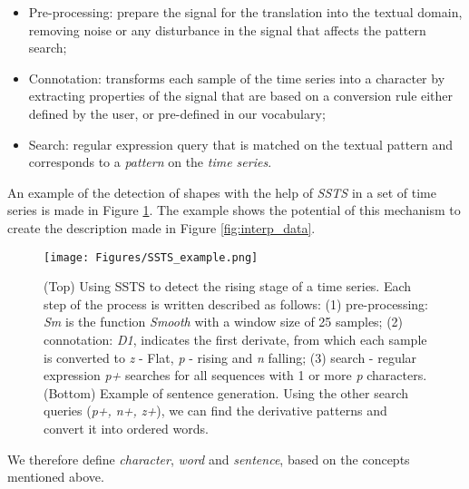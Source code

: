 \begin{itemize}
    \item Pre-processing: prepare the signal for the translation into the textual domain, removing noise or any disturbance in the signal that affects the pattern search;
    \item Connotation: transforms each sample of the time series into a character by extracting properties of the signal that are based on a conversion rule either defined by the user, or pre-defined in our vocabulary; 
    \item Search: regular expression query that is matched on the textual pattern and corresponds to a \textit{pattern} on the \textit{time series}.
\end{itemize}

An example of the detection of shapes with the help of \textit{SSTS} in a set of time series is made in Figure \ref{fig:SSTS_example}. The example shows the potential of this mechanism to create the description made in Figure \ref{fig:interp_data}. 

\begin{figure}
    \centering
    \texttt{[image: Figures/SSTS\_example.png]}
    \caption{(Top) Using SSTS to detect the rising stage of a time series. Each step of the process is written described as follows: (1) pre-processing: \textit{Sm} is the function \textit{Smooth} with a window size of 25 samples; (2) connotation: \textit{D1}, indicates the first derivate, from which each sample is converted to \textit{z} - Flat, \textit{p} - rising and \textit{n} falling; (3) search - regular expression \textit{p+} searches for all sequences with 1 or more \textit{p} characters. (Bottom) Example of sentence generation. Using the other search queries (\textit{p+, n+, z+}), we can find the derivative patterns and convert it into ordered words.}
    \label{fig:SSTS_example}
\end{figure}

We therefore define \textit{character}, \textit{word} and \textit{sentence}, based on the concepts mentioned above.\\

